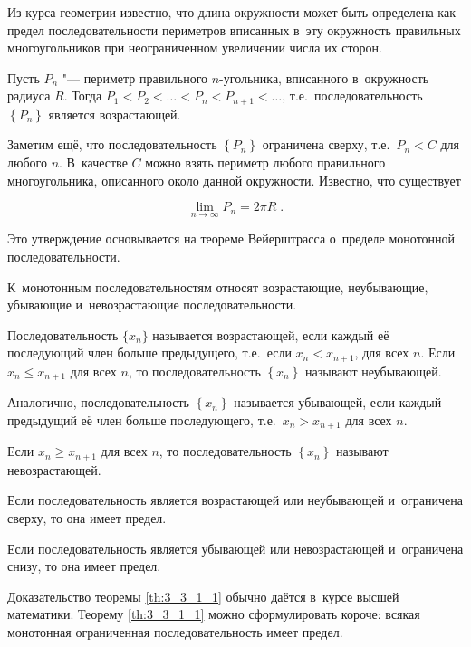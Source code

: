 
Из курса геометрии известно, что длина окружности может быть определена как предел
последовательности периметров вписанных в~эту окружность правильных многоугольников
при неограниченном увеличении числа их сторон.

Пусть $P_{n}$ "--- периметр правильного $n$-угольника, вписанного в~окружность
радиуса $R$. Тогда 
$P_{1} < P_{2} < \dots < P_{n} < P_{n+1} < \dots$,
т.е.\ последовательность $\left\{ P_{n} \right\}$ является возрастающей.

Заметим ещё, что последовательность $\left\{ P_{n} \right\}$ ограничена
сверху, т.е.\ $P_{n} < C$ для любого $n$. В~качестве $C$ можно взять периметр
любого правильного многоугольника, описанного около данной окружности.
Известно, что существует

\begin{equation*}
\displaystyle \lim_{n \to \infty} P_{n} = 2 \pi R \; .
\end{equation*}

Это утверждение основывается на теореме Вейерштрасса о~пределе монотонной
последовательности.

К~монотонным последовательностям относят возрастающие, неубывающие, убывающие
и~невозрастающие последовательности.

Последовательность $\{ x_{n} \}$ называется возрастающей,
если каждый её последующий член больше предыдущего,
т.е.\ если $x_{n} < x_{n+1}$, для всех $n$.
Если $x_{n} \leqslant x_{n+1}$ для всех $n$,
то последовательность $\left\{ x_{n} \right\}$ называют неубывающей.

Аналогично, последовательность $\left\{ x_{n} \right\}$ называется убывающей,
если каждый предыдущий её член больше последующего, т.е.\
$x_{n} > x_{n+1}$ для всех $n$.

Если $x_{n} \geqslant x_{n+1}$ для всех $n$, то последовательность
$\left\{ x_{n} \right\}$ называют невозрастающей.

\begin{Th}\label{th:3_3_1_1}
Если последовательность является возрастающей или неубывающей и~ограничена сверху,
то она имеет предел.

Если последовательность является убывающей или невозрастающей и~ограничена снизу,
то она имеет предел.
\end{Th}

Доказательство теоремы \ref{th:3_3_1_1} обычно даётся в~курсе высшей математики.
Теорему \ref{th:3_3_1_1} можно сформулировать короче: всякая монотонная ограниченная
последовательность имеет предел.


